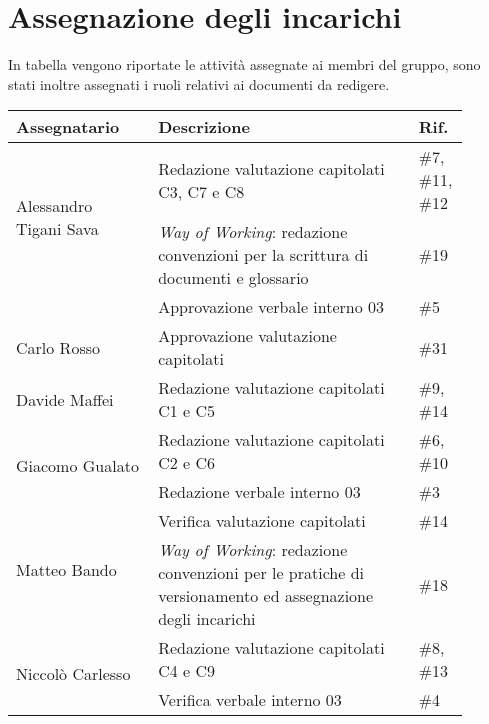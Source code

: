 \section{Assegnazione degli incarichi}
In tabella vengono riportate le attività assegnate ai membri del gruppo, sono stati inoltre assegnati i ruoli relativi ai documenti da redigere.

\begin{center}
    {
    \renewcommand{\arraystretch}{1.5}
    \begin{tabular}{p{0.30\linewidth}|p{0.55\linewidth}|p{0.05\linewidth}}
        \textbf{Assegnatario}                   &   \textbf{Descrizione}                        & \textbf{Rif.}     \\
        \hline
        \multirow{2}{*}{Alessandro Tigani Sava} 
						& Redazione valutazione capitolati C3, C7 e C8							& \#7, \#11, \#12	\\
        \cline{2-3}
                        & \textit{Way of Working}: redazione convenzioni per la scrittura di documenti e glossario & \#19 \\
        \cline{2-3}
        	           	& Approvazione verbale interno 03										& \#5				\\
        \hline 
        Carlo Rosso     & Approvazione valutazione capitolati									& \#31  			\\
        \hline
		Davide Maffei	& Redazione valutazione capitolati C1 e C5								& \#9, \#14 		\\
        \hline
        \multirow{2}{*}{Giacomo Gualato}        & Redazione valutazione capitolati C2 e C6  	& \#6, \#10 		\\
        \cline{2-3}
                        & Redazione verbale interno 03											& \#3				\\
        \hline
        \multirow{2}{*}{Matteo Bando}           & Verifica valutazione capitolati   			& \#14				\\
        \cline{2-3}
		& \textit{Way of Working}: redazione convenzioni per le pratiche di versionamento ed assegnazione degli incarichi 		
																								& \#18				\\
        \hline
        \multirow{2}{*}{Niccolò Carlesso}       & Redazione valutazione capitolati C4 e C9		& \#8, \#13 		\\
        \cline{2-3}
						& Verifica verbale interno 03											& \#4				\\
    \end{tabular}
    }
    \end{center}
